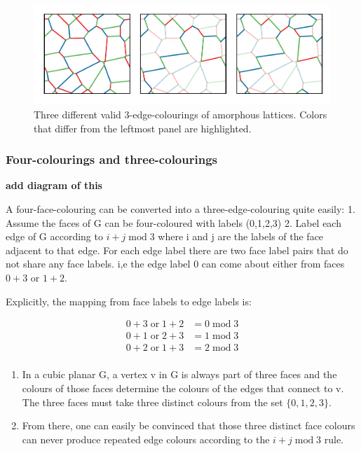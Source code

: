 \hypertarget{fig:multiple_colourings}{%
\begin{figure}
\centering
\includegraphics[width=1\textwidth,height=\textheight]{figure_code/amk_chapter/multiple_colourings/multiple_colourings}
\caption[{Colourings of an Amorphous Lattice}]{Three different valid 3-edge-colourings of amorphous lattices. Colors that differ from the leftmost panel are highlighted.}
\label{fig:multiple_colourings}
\end{figure}
}

\hypertarget{four-colourings-and-three-colourings}{%
\subsubsection{Four-colourings and three-colourings}\label{four-colourings-and-three-colourings}}

\textbf{add diagram of this}

A four-face-colouring can be converted into a three-edge-colouring quite easily: 1. Assume the faces of G can be four-coloured with labels (0,1,2,3) 2. Label each edge of G according to \(i + j \;\textrm{mod}\; 3\) where i and j are the labels of the face adjacent to that edge. For each edge label there are two face label pairs that do not share any face labels. i,e the edge label \(0\) can come about either from faces \(0 + 3\) or \(1 + 2\).

Explicitly, the mapping from face labels to edge labels is:

\[\begin{aligned}
0 + 3 \;\mathrm{or}\; 1 + 2 &= 0 \;\mathrm{mod}\; 3\\ 
0 + 1 \;\mathrm{or}\; 2 + 3 &= 1 \;\mathrm{mod}\; 3\\
0 + 2 \;\mathrm{or}\;1 + 3 &= 2 \;\mathrm{mod}\; 3\\
\end{aligned}
\]

\begin{enumerate}
\def\labelenumi{\arabic{enumi}.}
\setcounter{enumi}{2}
\item
  In a cubic planar G, a vertex v in G is always part of three faces and the colours of those faces determine the colours of the edges that connect to v. The three faces must take three distinct colours from the set \(\{0,1,2,3\}\).
\item
  From there, one can easily be convinced that those three distinct face colours can never produce repeated edge colours according to the \(i+j \;\mathrm{mod}\; 3\) rule.
\end{enumerate}

